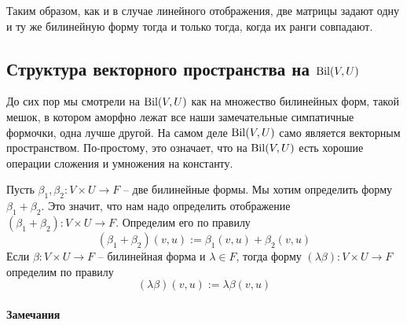 Таким образом, как и в случае линейного отображения, две матрицы задают одну и ту же билинейную форму тогда и только тогда, когда их ранги совпадают.


\subsection{Структура векторного пространства на $\operatorname{Bil}(V,U)$}

До сих пор мы смотрели на $\operatorname{Bil}(V, U)$ как на множество билинейных форм, такой мешок, в котором аморфно лежат все наши замечательные симпатичные формочки, одна лучше другой.
На самом деле $\operatorname{Bil}(V, U)$ само является векторным пространством.
По-простому, это означает, что на $\operatorname{Bil}(V, U)$ есть хорошие операции сложения и умножения на константу.


\begin{definition}
Пусть $\beta_1,\beta_2\colon V\times U \to F$ -- две билинейные формы.
Мы хотим определить форму $\beta_1 + \beta_2$.
Это значит, что нам надо определить отображение $(\beta_1 + \beta_2)\colon V\times U \to F$.
Определим его по правилу
\[
(\beta_1 + \beta_2)(v, u) := \beta_1(v,u) + \beta_2(v,u)
\]
Если $\beta\colon V\times U \to F$ -- билинейная форма и $\lambda\in F$, тогда форму $(\lambda \beta)\colon V\times U \to F$ определим по правилу
\[
(\lambda\beta)(v, u) := \lambda \beta(v, u)
\]
\end{definition}

\paragraph{Замечания}

